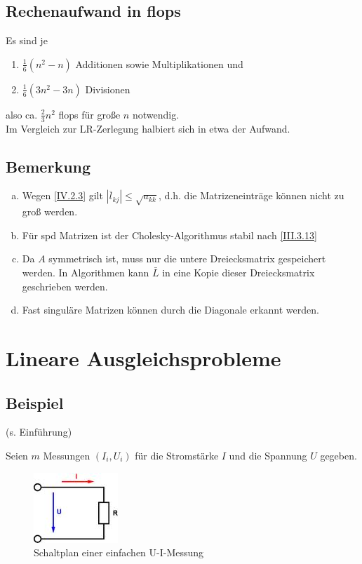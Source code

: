 \documentclass[ngerman,fontsize=11pt, paper=a4, parskip=half, titlepage=true, toc=bib]{scrbook}
\newcommand{\sectione}[1]{\section{#1} \setcounter{equation}{0}}
\begin{document}
  
  
  \subsection{Rechenaufwand in flops}
  Es sind je 
  \begin{enumerate}
  \item[] $\frac{1}{6}(n^2-n) $ Additionen sowie Multiplikationen und 
  \item[]  $\frac{1}{6}(3n^2-3n) $ Divisionen 
  \end{enumerate}
  also ca. $\frac{2}{3} n^2$ flops für große $n$ notwendig. \\
  Im Vergleich zur LR-Zerlegung halbiert sich in etwa der Aufwand.
  
  \subsection{Bemerkung}
  \begin{enumerate}[a)]
  \item Wegen \eqref{IV.2.3} gilt $|\overline{l}_{kj}| \leq \sqrt{a_{kk}}$,
    d.h. die Matrizeneinträge können nicht zu groß werden.
  \item Für spd Matrizen ist der Cholesky-Algorithmus stabil nach \eqref{III.3.13}
  \item Da $A$ symmetrisch ist, muss nur die untere Dreiecksmatrix gespeichert werden.
    In Algorithmen kann $\bar{L}$ in eine Kopie dieser Dreiecksmatrix geschrieben werden.
  \item Fast singuläre Matrizen können durch die Diagonale erkannt werden.
  \end{enumerate}
  
  
  \sectione{Lineare Ausgleichsprobleme} 
  
  \subsection{Beispiel}
  (s. Einführung)
  
  Seien $m$ Messungen $(I_i, U_i)$ für die Stromstärke $I$ und die Spannung $U$ gegeben. \\
  
  \begin{figure}
    \parbox{\linewidth}{
      \centering
      \includegraphics{images/ohmsche.jpeg}
    }
    \caption{Schaltplan einer einfachen U-I-Messung}
  \end{figure}
  
\end{document}
